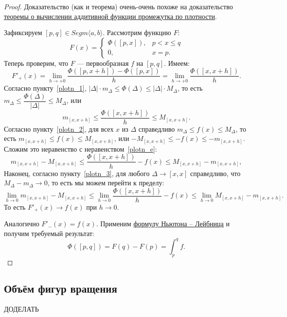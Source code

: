 \begin{proof}
	Доказательство (как и теорема) очень-очень похоже на доказательство \hyperlink{afp}{теоремы о вычислении аддитивной функции промежутка по плотности}.
	
	Зафиксируем \([p, q] \in Segm \langle a, b \rangle\). Рассмотрим функцию \(F\): \[
	F(x) =
	\begin{cases}
		\Phi([p, x]), & p < x \leqslant q \\
		0,			  & x = p.
	\end{cases}
	\]
	Теперь проверим, что \(F\) --- первообразная \(f\) на \([p, q]\). Имеем: \[
	F'_+(x) = \lim_{h \to +0} \frac{\Phi([p, x + h]) - \Phi([p, x])}{h} = \lim_{h \to +0} \frac{\Phi([x, x + h])}{h}.
	\]
	Согласно пункту~\ref{plotn_1}, \(|\Delta| \cdot m_\Delta \leqslant \Phi(\Delta) \leqslant |\Delta| \cdot M_\Delta\), то есть \(m_\Delta \leqslant \dfrac{\Phi(\Delta)}{|\Delta|} \leqslant M_\Delta\), или
	\begin{equation} \label{plotn_e}
		m_{[x, x + h]} \leqslant \frac{\Phi([x, x + h])}{h} \leqslant M_{[x, x + h]}.
	\end{equation}
	Согласно пункту~\ref{plotn_2}, для всех \(x \) из \(\Delta\) справедливо \(m_\Delta \leqslant f(x) \leqslant M_\Delta\), то есть \(m_{[x, x + h]} \leqslant f(x) \leqslant M_{[x, x + h]}\), или \(-M_{[x, x + h]} \leqslant -f(x) \leqslant -m_{[x, x + h]}\). Сложим это неравенство с неравенством~\eqref{plotn_e}: \[
	m_{[x, x + h]} - M_{[x, x + h]} \leqslant \frac{\Phi([x, x + h])}{h} - f(x) \leqslant M_{[x, x + h]} - m_{[x, x + h]},
	\]
	Наконец, согласно пункту~\ref{plotn_3}, для любого \(\Delta \to [x, x]\) справедливо, что \(M_\Delta - m_\Delta \to 0\), то есть мы можем перейти к пределу: \[
	\lim_{h \to 0} m_{[x, x + h]} - M_{[x, x + h]} \leqslant \lim_{h \to 0} \frac{\Phi([x, x + h])}{h} - f(x) \leqslant \lim_{h \to 0} M_{[x, x + h]} - m_{[x, x + h]}.
	\]
	То есть \(F'_+(x) \to  f(x)\) при \(h \to 0\).
	
	Аналогично \(F'_-(x) = f(x)\). Применим \hyperlink{t9}{формулу Ньютона -- Лейбница} и получим требуемый результат: \[
	\Phi([p, q]) = F(q) - F(p) = \int_p^q f.
	\]
\end{proof}

\subsection{Объём фигур вращения}

\begin{theorem}
	ДОДЕЛАТЬ
\end{theorem}

